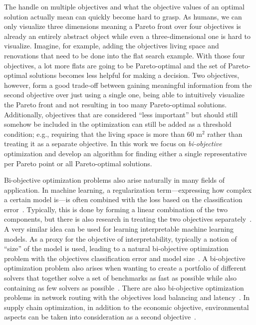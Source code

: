 
The handle on multiple objectives and what the objective values of an optimal solution actually mean can quickly become hard to grasp.
As humans, we can only visualize three dimensions meaning a Pareto front over four objectives is already an entirely abstract object while even a three-dimensional one is hard to visualize.
Imagine, for example, adding the objectives living space and renovations that need to be done into the flat search example.
With those four objectives, a lot more flats are going to be Pareto-optimal and the set of Pareto-optimal solutions becomes less helpful for making a decision.
Two objectives, however, form a good trade-off between gaining meaningful information from the second objective over just using a single one, being able to intuitively visualize the Pareto front and not resulting in too many Pareto-optimal solutions.
Additionally, objectives that are considered ``less important'' but should still somehow be included in the optimization can still be added as a threshold condition;
e.g., requiring that the living space is more than 60 $\text{m}^2$ rather than treating it as a separate objective.
In this work we focus on \emph{bi-objective} optimization and develop an algorithm for finding either a single representative per Pareto point or all Pareto-optimal solutions.

Bi-objective optimization problems also arise naturally in many fields of application.
In machine learning, a regularization term---expressing how complex a certain model is---is often combined with the loss based on the classification error~\autocite{}.
Typically, this is done by forming a linear combination of the two components, but there is also research in treating the two objectives separately~\autocite{DBLP:journals/tsmc/JinS08}.
A very similar idea can be used for learning interpretable machine learning models.
As a proxy for the objective of interpretability, typically a notion of ``size'' of the model is used, leading to a natural bi-objective optimization problem with the objectives classification error and model size~\autocite{DBLP:conf/ijcai/Ignatiev0NS21,DBLP:conf/cp/MaliotovM18,DBLP:conf/ijcai/NarodytskaIPM18,DBLP:conf/ijcai/Hu0HH20,DBLP:conf/cp/YuISB20,DBLP:conf/aaai/Ignatiev0S021}.
A bi-objective optimization problem also arises when wanting to create a portfolio of different solvers that together solve a set of benchmarks as fast as possible while also containing as few solvers as possible~\autocite{DBLP:conf/cp/JanotaMSM21}.
There are also bi-objective optimization problems in network routing with the objectives load balancing and latency~\autocite{SilverioEtAl2022biobjectiveoptimization}.
In supply chain optimization, in addition to the economic objective, environmental aspects can be taken into consideration as a second objective~\autocite{DBLP:journals/cce/Pinto-VarelaBN11}.

